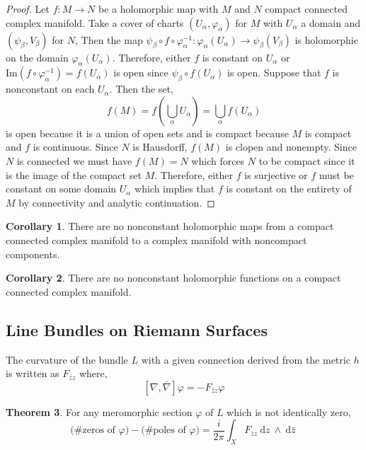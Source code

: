 \documentclass[12pt]{extarticle}
\renewcommand{\Im}[1]{\mathrm{Im}(#1)}
\renewcommand{\d}[1]{\: \mathrm{d}#1 \:}
\theoremstyle{definition}
\newtheorem{theorem}{Theorem}[section]
\newtheorem{corollary}[theorem]{Corollary}
\newenvironment{definition}[1][Definition:]{\begin{trivlist}
\item[\hskip \labelsep {\bfseries #1}]}{\end{trivlist}}
\begin{document}
\begin{proof}
Let $f : M \to N$ be a holomorphic map with $M$ and $N$ compact connected complex manifold. Take a cover of charts $(U_\alpha, \varphi_\alpha)$ for $M$ with $U_\alpha$ a domain and $(\psi_\beta, V_\beta)$ for $N$, Then the map $\psi_\beta \circ f \circ \varphi_\alpha^{-1} : \varphi_\alpha(U_\alpha) \to \psi_\beta(V_\beta)$ is holomorphic on the domain $\varphi_\alpha(U_\alpha)$. Therefore, either $f$ is constant on $U_\alpha$ or $\Im{f \circ \varphi_\alpha^{-1}} = f(U_\alpha)$ is open since $\psi_\beta \circ f(U_\alpha)$ is open. Suppose that $f$ is nonconstant on each $U_\alpha$. Then the set,
\[ f(M) = f\left(\bigcup_{\alpha} U_\alpha\right) = \bigcup_\alpha f(U_\alpha) \]
is open because it is a union of open sets and is compact because $M$ is compact and $f$ is continuous. Since $N$ is Hausdorff, $f(M)$ is clopen and nonempty. Since $N$ is connected we must have $f(M) = N$ which forces $N$ to be compact since it is the image of the compact set $M$. Therefore, either $f$ is surjective or $f$ must be constant on some domain $U_\alpha$ which implies that $f$ is constant on the entirety of $M$ by connectivity and analytic continuation.  
\end{proof}

\begin{corollary}
There are no nonconstant holomorphic maps from a compact connected complex manifold to a complex manifold with noncompact components. 
\end{corollary}

\begin{corollary}
There are no nonconstant holomorphic functions on a compact connected complex manifold. 
\end{corollary}

\subsection{Line Bundles on Riemann Surfaces}


\begin{definition}
The curvature of the bundle $L$ with a given connection derived from the metric $h$ is written as $F_{\bar{z}z}$ where,
\[ [\nabla, \bar{\nabla}] \varphi = - F_{\bar{z}z} \varphi \]
\end{definition}

\begin{theorem}
For any meromorphic section $\varphi$ of $L$ which is not identically zero,
\[ \text{(\# zeros of $\varphi$)} - \text{(\# poles of $\varphi$)} = \frac{i}{2 \pi} \int_X F_{\bar{z} z} \d{z} \wedge \d{\bar{z}} \]
\end{theorem}
\end{document}
